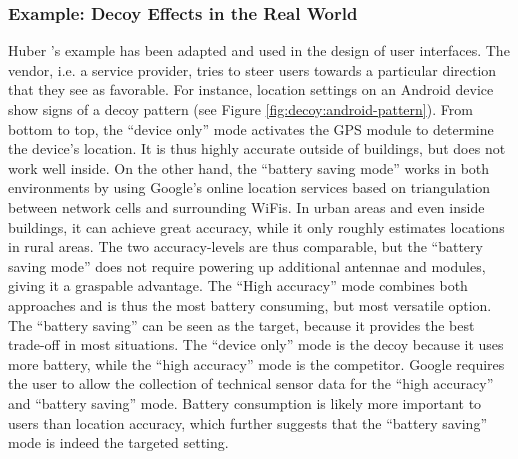 \subsubsection{Example: Decoy Effects in the Real World}
Huber \etal's example has been adapted and used in the design of user interfaces. The vendor, i.e. a service provider, tries to steer users towards a particular direction that they see as favorable. For instance, location settings on an Android device show signs of a decoy pattern (see Figure \ref{fig:decoy:android-pattern}). From bottom to top, the ``device only'' mode activates the GPS module to determine the device's location. It is thus highly accurate outside of buildings, but does not work well inside. On the other hand, the ``battery saving mode'' works in both environments by using Google's online location services based on triangulation between network cells and surrounding WiFis. In urban areas and even inside buildings, it can achieve great accuracy, while it only roughly estimates locations in rural areas. The two accuracy-levels are thus comparable, but the ``battery saving mode'' does not require powering up additional antennae and modules, giving it a graspable advantage. The ``High accuracy'' mode combines both approaches and is thus the most battery consuming, but most versatile option. The ``battery saving'' can be seen as the target, because it provides the best trade-off in most situations. The ``device only'' mode is the decoy because it uses more battery, while the ``high accuracy'' mode is the competitor. Google requires the user to allow the collection of technical sensor data for the ``high accuracy'' and ``battery saving'' mode. Battery consumption is likely more important to users than location accuracy, which further suggests that the ``battery saving'' mode is indeed the targeted setting. 

